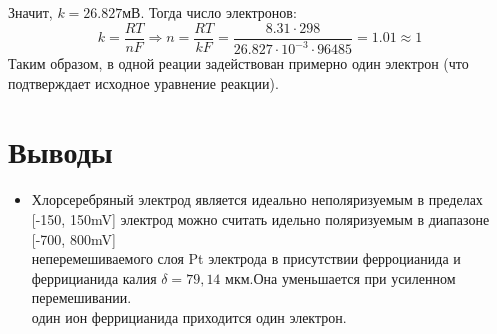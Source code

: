 \documentclass[a4paper,12pt]{article}
\begin{document}
Значит, $k = 26.827 мВ$. Тогда число электронов:
\begin{equation*}
    k = \frac{RT}{nF} \Rightarrow n = \frac{RT}{kF} = \frac{8.31 \cdot 298}{26.827 \cdot 10^{-3} \cdot 96485} = 1.01\approx 1
\end{equation*}
Таким образом, в одной реации задействован примерно один электрон (что подтверждает исходное уравнение реакции). \\
\section{Выводы}
\begin{itemize}
\item Хлорсеребряный электрод является идеально неполяризуемым в пределах [-150, 150mV]
 электрод можно считать идельно поляризуемым в диапазоне [-700, 800mV]\\
 неперемешиваемого слоя Pt электрода в присутствии ферроцианида и феррицианида калия $\delta = 79, 14 $ мкм.Она уменьшается при усиленном перемешивании.\\ 
 один ион феррицианида приходится один электрон.
\end{itemize}
\end{document}
